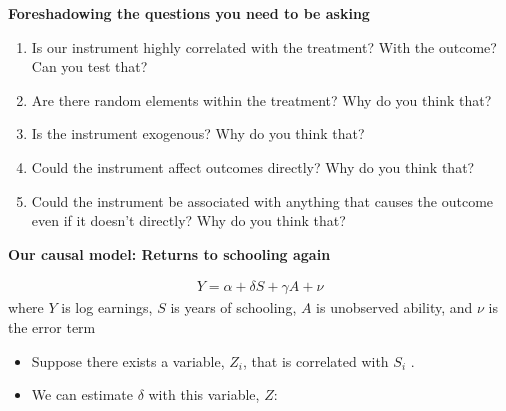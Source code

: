 \documentclass[notes=show]{beamer}
\begin{document}
\begin{frame}[plain]
\begin{center}
\textbf{Foreshadowing the questions you need to be asking}
\end{center}

\begin{enumerate}
	\item Is our instrument highly correlated with the treatment? With the outcome? Can you test that?
	\item Are there random elements within the treatment? Why do you think that?
	\item Is the instrument exogenous?  Why do you think that?
	\item Could the instrument affect outcomes directly? Why do you think that?
	\item Could the instrument be associated with anything that causes the outcome even if it doesn't directly? Why do you think that?
\end{enumerate}

\end{frame}




\begin{frame}[plain]
\begin{center}
\textbf{Our causal model: Returns to schooling again}
\end{center}\begin{eqnarray*}
Y = \alpha + \delta S + \gamma A + \nu
\end{eqnarray*}
where $Y$ is log earnings, $S$ is years of schooling, $A$ is unobserved ability, and $\nu$ is the error term

\begin{itemize}
	\item Suppose there exists a variable, $Z_i$, that is correlated with $S_i$ .
	\item We can estimate $\delta$ with this variable, $Z$:
\end{itemize}

\end{frame}
\end{document}
